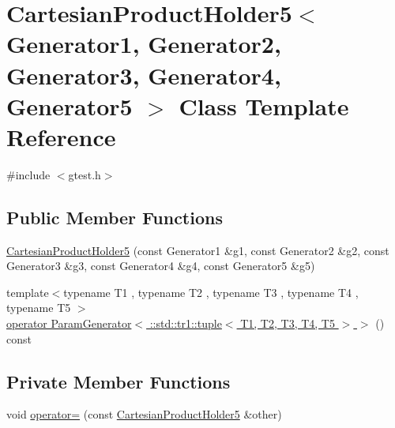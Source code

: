 \hypertarget{classtesting_1_1internal_1_1CartesianProductHolder5}{\section{\-Cartesian\-Product\-Holder5$<$ \-Generator1, \-Generator2, \-Generator3, \-Generator4, \-Generator5 $>$ \-Class \-Template \-Reference}
\label{d6/dd0/classtesting_1_1internal_1_1CartesianProductHolder5}
}


{\ttfamily \#include $<$gtest.\-h$>$}

\subsection*{\-Public \-Member \-Functions}
\begin{DoxyCompactItemize}
\item 
\hyperlink{classtesting_1_1internal_1_1CartesianProductHolder5_acb099b5231ea1533c815fd5ab26b7e14}{\-Cartesian\-Product\-Holder5} (const \-Generator1 \&g1, const \-Generator2 \&g2, const \-Generator3 \&g3, const \-Generator4 \&g4, const \-Generator5 \&g5)
\item 
{\footnotesize template$<$typename T1 , typename T2 , typename T3 , typename T4 , typename T5 $>$ }\\\hyperlink{classtesting_1_1internal_1_1CartesianProductHolder5_a3eab8b9d8b44a77f611b3c2aee110174}{operator Param\-Generator$<$ \-::std\-::tr1\-::tuple$<$ T1, T2, T3, T4, T5 $>$ $>$} () const 
\end{DoxyCompactItemize}
\subsection*{\-Private \-Member \-Functions}
\begin{DoxyCompactItemize}
\item 
void \hyperlink{classtesting_1_1internal_1_1CartesianProductHolder5_a324b8712a65a70e22d341b1bbe5d510b}{operator=} (const \hyperlink{classtesting_1_1internal_1_1CartesianProductHolder5}{\-Cartesian\-Product\-Holder5} \&other)
\end{DoxyCompactItemize}
